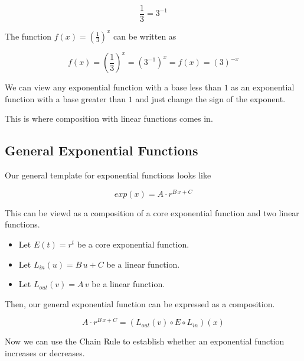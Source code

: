 \documentclass{ximera}
\begin{document}
\[
\frac{1}{3} = 3^{-1}
\]




The function  $f(x) = \left(\frac{1}{3}\right)^x$ can be written as 

\[
f(x) = \left(\frac{1}{3}\right)^x = \left( 3^{-1} \right)^x = f(x) = \left( 3 \right)^{-x}
\]




We can view any exponential function with a base less than $1$ as an exponential function with a base greater than $1$ and just change the sign of the exponent. 

This is where composition with linear functions comes in.





\subsection*{General Exponential Functions}



Our general template for exponential functions looks like

\[
exp(x) = A \cdot r^{B \, x + C}
\]


This can be viewd as a composition of a core exponential function and two linear functions.



\begin{itemize}
\item Let $E(t) = r^t$ be a core exponential function.
\item Let $L_{in}(u) = B \, u + C$ be a linear function.
\item Let $L_{out}(v) = A \, v$ be a linear function.
\end{itemize}

Then, our general exponential function can be expressed as a composition.


\[
 A \cdot r^{B \, x + C} = (L_{out}(v) \circ E \circ L_{in})(x)
\]



Now we can use the Chain Rule to establish whether an exponential function increases or decreases.
\end{document}
